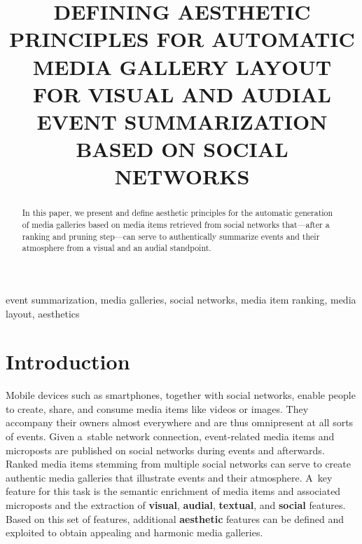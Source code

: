 \documentclass{article}
\title{DEFINING AESTHETIC PRINCIPLES FOR AUTOMATIC MEDIA GALLERY LAYOUT\\
FOR VISUAL AND AUDIAL EVENT SUMMARIZATION BASED ON SOCIAL NETWORKS}
\let\oldsection\section
\renewcommand{\section}[1]{\oldsection{#1}\vspace{-0.95em}}
\begin{document}
\maketitle

\begin{abstract}
In this paper, we present and define aesthetic principles
for the automatic generation of media galleries
based on media items retrieved from social networks
that---after a ranking and pruning step---can serve to authentically
summarize events and their atmosphere from a visual
and an audial standpoint.
\end{abstract}

\begin{keywords}
event summarization, media galleries, social networks,
media item ranking, media layout, aesthetics
\end{keywords}

\vspace{-0.95em}
\section{Introduction}
Mobile devices such as smartphones, together with social networks,
enable people to create, share, and consume media items
like videos or images.
They accompany their owners almost everywhere
and are thus omnipresent at all sorts of events.
Given a~stable network connection, event-related media items
and microposts are published on social networks
during events and afterwards.
Ranked media items stemming from multiple social networks
can serve to create authentic media galleries
that illustrate events and their atmosphere.
A~key feature for this task is the semantic enrichment
of media items and associated microposts
and the extraction of \textbf{visual}, \textbf{audial},
\textbf{textual}, and \textbf{social} features.
Based on this set of features,
additional \textbf{aesthetic} features
can be defined and exploited to obtain appealing
and harmonic media galleries.
\end{document}
